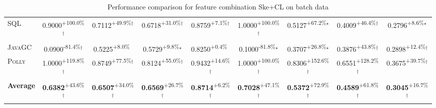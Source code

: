 \begin{table}[htbp]
\begin{tabular}{l|cccc|cccc}
\textsc{SQL} & \cellcolor{green!30}0.9000\textsuperscript{+100.0\%}$^\dagger$ & \cellcolor{green!30}0.7112\textsuperscript{+49.9\%}$^\dagger$ & \cellcolor{green!30}0.6718\textsuperscript{+31.0\%}$^\dagger$ & \cellcolor{green!30}0.8759\textsuperscript{+7.1\%}$^\dagger$ & \cellcolor{green!30}1.0000\textsuperscript{+100.0\%}$^\dagger$ & \cellcolor{green!30}0.5127\textsuperscript{+67.2\%}$^\star$ & \cellcolor{green!30}0.4009\textsuperscript{+46.4\%}$^\dagger$ & \cellcolor{green!30}0.2796\textsuperscript{+8.6\%}$^\star$ \\
\textsc{JavaGC} & \cellcolor{red!30}0.0900\textsuperscript{-81.4\%}$^\dagger$ & \cellcolor{green!30}0.5225\textsuperscript{+8.0\%}$^{\,\,\,}$ & \cellcolor{green!30}0.5729\textsuperscript{+9.8\%}$^\star$ & \cellcolor{green!30}0.8250\textsuperscript{+0.4\%}$^{\,\,\,}$ & \cellcolor{red!30}0.1000\textsuperscript{-81.8\%}$^\star$ & \cellcolor{green!30}0.3707\textsuperscript{+26.8\%}$^\star$ & \cellcolor{green!30}0.3876\textsuperscript{+43.8\%}$^\dagger$ & \cellcolor{green!30}0.2898\textsuperscript{+12.4\%}$^\dagger$ \\
\textsc{Polly} & \cellcolor{green!30}1.0000\textsuperscript{+119.8\%}$^\dagger$ & \cellcolor{green!30}0.8749\textsuperscript{+77.5\%}$^\dagger$ & \cellcolor{green!30}0.8124\textsuperscript{+55.0\%}$^\dagger$ & \cellcolor{green!30}0.9432\textsuperscript{+14.6\%}$^\dagger$ & \cellcolor{green!30}1.0000\textsuperscript{+100.0\%}$^\dagger$ & \cellcolor{green!30}0.8306\textsuperscript{+152.6\%}$^\dagger$ & \cellcolor{green!30}0.6551\textsuperscript{+128.2\%}$^\dagger$ & \cellcolor{green!30}0.3675\textsuperscript{+39.7\%}$^\dagger$ \\
\hline
\textbf{Average} & \cellcolor{green!30}\textbf{0.6382}\textsuperscript{+43.6\%}$^\dagger$ & \cellcolor{green!30}\textbf{0.6507}\textsuperscript{+34.0\%}$^\dagger$ & \cellcolor{green!30}\textbf{0.6569}\textsuperscript{+26.7\%}$^\dagger$ & \cellcolor{green!30}\textbf{0.8714}\textsuperscript{+6.2\%}$^\dagger$ & \cellcolor{green!30}\textbf{0.7028}\textsuperscript{+47.1\%}$^\dagger$ & \cellcolor{green!30}\textbf{0.5372}\textsuperscript{+72.9\%}$^\dagger$ & \cellcolor{green!30}\textbf{0.4589}\textsuperscript{+61.8\%}$^\dagger$ & \cellcolor{green!30}\textbf{0.3045}\textsuperscript{+16.7\%}$^\dagger$ \\
\hline
\end{tabular}
\caption{Performance comparison for feature combination Ske+CL on batch data}
\label{tab:combo_Ske_CL_performance_batch}
\end{table}